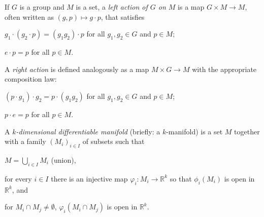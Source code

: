 \documentclass[../main.tex]{subfiles}
\begin{document}
\begin{definition}\label{GroupAction}
    If \(G\) is a group and \(M\) is a set,
    a \textit{left action of \(G\) on \(M\)}
    is a map \(G \times M \to M\),
    often written as \(\left(g,p\right)\mapsto g \cdot p\),
    that satisfies
    \begin{APAitemize}
        \item \(g_1 \cdot \left(g_2 \cdot p\right)=\left(g_1 g_2\right) \cdot p\) for all \(g_1,g_2 \in G\) and \(p \in M\);
        \item \(e \cdot p = p\) for all \(p \in M\).
    \end{APAitemize}
    A \textit{right action} is defined analogously
    as a map \(M \times G \to M\)
    with the appropriate composition law:
    \begin{APAitemize}
        \item \(\left(p \cdot g_1\right) \cdot g_2 = p \cdot \left(g_1 g_2\right)\) for all \(g_1,g_2 \in G\) and \(p \in M\);
        \item \(p \cdot e = p\) for all \(p \in M\).
    \end{APAitemize}
\end{definition}
\begin{definition}\label{Manifold}
    A \textit{\(k\)-dimensional differentiable manifold} (briefly: a \(k\)-manifold)
    is a set \(M\) together with a family \(\left(M_i\right)_{i\in I}\) of subsets such that
    \begin{APAenumerate}
        \item \(M=\bigcup_{i\in I} M_i\) (union),
        \item for every \(i\in I\) there is an injective map \(\varphi_i\colon M_i\to\mathbb{R}^k\) so that \(\phi_i\left(M_i\right)\) is open in \(\mathbb{R}^k\), and
        \item for \(M_i\cap M_j\ne\emptyset\), \(\varphi_i\left(M_i\cap M_j\right)\) is open in \(\mathbb{R}^k\).
    \end{APAenumerate}
\end{definition}
\end{document}
